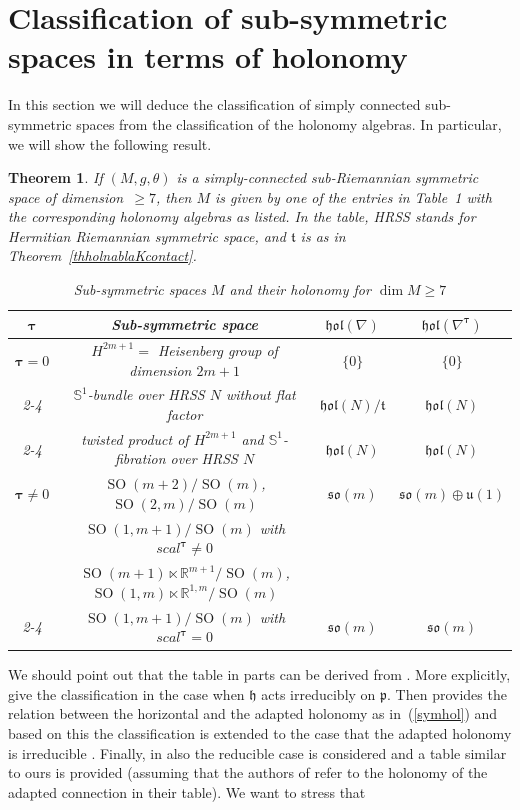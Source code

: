 \documentclass{amsart}
\theoremstyle{plain}
\newtheorem{theorem}{Theorem}[section]
\theoremstyle{definition}
\newcommand{\SO}{\operatorname{SO}}
\def\so{\mathfrak{so}}
\def\u{\mathfrak{u}}
\def\t{\mathfrak{t}}
\newcommand{\h}{\mathfrak{h}}
\newcommand{\hol}{\mathfrak{hol}}
\newcommand{\bt}{{\boldsymbol{\tau}}}
\newcommand{\Real}{\mathbb{R}}
\newcommand{\1}{\mathbf{1}}
\newcommand{\p}{\mathfrak{p}}
\newcommand{\+}{\oplus}
\begin{document}
\section{Classification of sub-symmetric spaces in terms of holonomy}
\label{subsymholclass-sec}

In this section we will deduce the classification of simply connected sub-symmetric spaces from the classification of the holonomy algebras. In particular, we will show the following result.
\begin{theorem}\label{subsymholclass-thm}If $(M,g,\theta)$ is a simply-connected sub-Riemannian symmetric space of dimension~$\ge 7$, then $M$ is given by one of the entries in Table~1 with the corresponding holonomy algebras as listed. 
In the table, HRSS stands for Hermitian Riemannian symmetric space, and $\t$ is as in Theorem~\ref{thholnablaKcontact}. 

\begin{table}[h]%
	\caption{Sub-symmetric spaces $M$ and their holonomy for $\dim M\geq 7$}
	\begin{tabular}{|c|c|c|c|}\hline
		$\bt$ & Sub-symmetric space & $\hol(\nabla)$ & $\hol(\nabla^\bt)$\\ \hline
		$\bt=0$ & $H^{2m+1}=$  Heisenberg group of dimension $2m+1$ & $\{0\}$ & $\{0\}$\\\cline{2-4}
		&  $\mathbb{S}^1$-bundle over HRSS $N$ without flat factor& $\hol(N)/\t$ & $\hol(N)$\\ \cline{2-4}
		& twisted product of $H^{2m+1}$ and $\mathbb{S}^1$-fibration over HRSS $N$ & $\hol(N)$ & $\hol(N)$\\ \hline
		$\bt\neq 0$ & $\SO(m+2)/\SO(m)$, $\SO(2,m)/\SO(m)$  & $\so(m)$ & $\so(m)\oplus\u(1)$\\
		&  $\SO(1,m+1)/\SO(m)$ with $scal^\bt\neq 0$ &  & \\
		& $\SO(m+1)\ltimes\Real^{m+1} /\SO(m)$, $\SO(1,m)\ltimes\Real^{1,m} /\SO(m)$  &  & \\ \cline{2-4}
		&  $\SO(1,m+1)/\SO(m)$ with $scal^\bt= 0$ & $\so(m)$ & $\so(m)$ \\ \hline 
	\end{tabular}
\end{table}
\end{theorem}
We should point out that the table in parts can be derived from \cite{BFG,FG,FGR}. More explicitly,  \cite[Theorem 5.1]{FG} give the classification in the case when $\h$ acts irreducibly on $\p$. Then \cite[Theorem 5.1]{FGR} provides the relation between the horizontal and the adapted holonomy as in~(\ref{symhol}) and based on this  the classification is extended to the case that the adapted holonomy is irreducible \cite[Theorem~6.1]{FGR}. Finally, in  \cite{BFG} also the reducible case is considered and a table similar to ours is provided (assuming that the authors of \cite{BFG}  refer to the holonomy of the adapted connection in their table). We want to stress that
\end{document}

